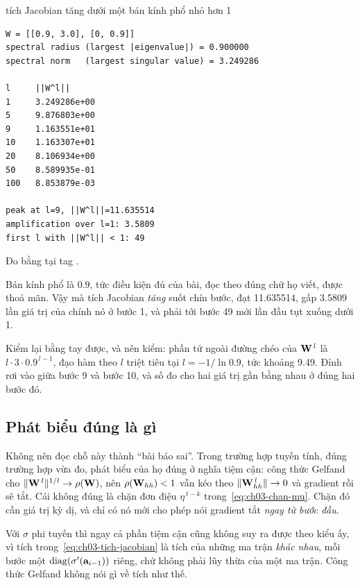 \begin{measured}{tích Jacobian tăng dưới một bán kính phổ nhỏ hơn 1}
\begin{verbatim}
W = [[0.9, 3.0], [0, 0.9]]
spectral radius (largest |eigenvalue|) = 0.900000
spectral norm   (largest singular value) = 3.249286

l     ||W^l||
1     3.249286e+00
5     9.876803e+00
9     1.163551e+01
10    1.163307e+01
20    8.106934e+00
50    8.589935e-01
100   8.853879e-03

peak at l=9, ||W^l||=11.635514
amplification over l=1: 3.5809
first l with ||W^l|| < 1: 49
\end{verbatim}

Đo bằng  tại tag .
\end{measured}

Bán kính phổ là \(0.9\), tức điều kiện đủ của bài, đọc theo đúng chữ họ viết,
được thoả mãn. Vậy mà tích Jacobian \emph{tăng} suốt chín bước, đạt 11.635514,
gấp 3.5809 lần giá trị của chính nó ở bước 1, và phải tới bước 49 mới lần đầu
tụt xuống dưới 1.

Kiểm lại bằng tay được, và nên kiểm: phần tử ngoài đường chéo của
\(\mathbf{W}^{\,l}\) là \(l \cdot 3 \cdot 0.9^{\,l-1}\), đạo hàm theo \(l\) triệt
tiêu tại \(l = -1/\ln 0.9\), tức khoảng 9.49. Đỉnh rơi vào giữa bước 9 và bước
10, và số đo cho hai giá trị gần bằng nhau ở đúng hai bước đó.

\subsection*{Phát biểu đúng là gì}

%
Không nên đọc chỗ này thành \enquote{bài báo sai}. Trong trường hợp tuyến tính,
đúng trường hợp vừa đo, phát biểu của họ đúng ở nghĩa tiệm cận: công thức
Gelfand cho \(\lVert \mathbf{W}^{\,l} \rVert^{1/l} \to \rho(\mathbf{W})\), nên
\(\rho(\mathbf{W}_{hh}) < 1\) vẫn kéo theo \(\lVert \mathbf{W}_{hh}^{\,l} \rVert \to 0\) và
gradient rồi sẽ tắt. Cái không đúng là chặn đơn điệu \(\eta^{\,t-k}\)
trong~\eqref{eq:ch03-chan-mu}. Chặn đó cần giá trị kỳ dị, và chỉ có nó mới cho
phép nói gradient tắt \emph{ngay từ bước đầu}.

Với \(\sigma\) phi tuyến thì ngay cả phần tiệm cận cũng không suy ra được theo
kiểu ấy, vì tích trong~\eqref{eq:ch03-tich-jacobian} là tích của những ma trận
\emph{khác nhau}, mỗi bước một \(\operatorname{diag}(\sigma'(\mathbf{a}_{i-1}))\) riêng, chứ
không phải lũy thừa của một ma trận. Công thức Gelfand không nói gì về tích như
thế.

